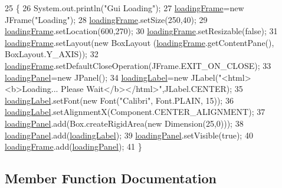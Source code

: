 \begin{DoxyCode}
25     \{
26         System.out.println(\textcolor{stringliteral}{"Gui Loading"});
27         \hyperlink{classGuiLoading_a7790e84aa69edf129d802057d0420608}{loadingFrame}=\textcolor{keyword}{new} JFrame(\textcolor{stringliteral}{"Loading"});
28         \hyperlink{classGuiLoading_a7790e84aa69edf129d802057d0420608}{loadingFrame}.setSize(250,40); 
29         \hyperlink{classGuiLoading_a7790e84aa69edf129d802057d0420608}{loadingFrame}.setLocation(600,270);
30         \hyperlink{classGuiLoading_a7790e84aa69edf129d802057d0420608}{loadingFrame}.setResizable(\textcolor{keyword}{false});
31         \hyperlink{classGuiLoading_a7790e84aa69edf129d802057d0420608}{loadingFrame}.setLayout(\textcolor{keyword}{new} BoxLayout (\hyperlink{classGuiLoading_a7790e84aa69edf129d802057d0420608}{loadingFrame}.getContentPane(), 
      BoxLayout.Y\_AXIS));
32         \hyperlink{classGuiLoading_a7790e84aa69edf129d802057d0420608}{loadingFrame}.setDefaultCloseOperation(JFrame.EXIT\_ON\_CLOSE);
33         \hyperlink{classGuiLoading_ad7da2e974b1f70476fc92e8b3dc7e853}{loadingPanel}=\textcolor{keyword}{new} JPanel();
34         \hyperlink{classGuiLoading_a885e7ee695236c2a7a4428658828b827}{loadingLabel}=\textcolor{keyword}{new} JLabel(\textcolor{stringliteral}{"<html><b>Loading... Please Wait</b></html>"},JLabel.CENTER);
35         \hyperlink{classGuiLoading_a885e7ee695236c2a7a4428658828b827}{loadingLabel}.setFont(\textcolor{keyword}{new} Font(\textcolor{stringliteral}{"Calibri"}, Font.PLAIN, 15));
36         \hyperlink{classGuiLoading_a885e7ee695236c2a7a4428658828b827}{loadingLabel}.setAlignmentX(Component.CENTER\_ALIGNMENT);
37         \hyperlink{classGuiLoading_ad7da2e974b1f70476fc92e8b3dc7e853}{loadingPanel}.add(Box.createRigidArea(\textcolor{keyword}{new} Dimension(25,0)));
38         \hyperlink{classGuiLoading_ad7da2e974b1f70476fc92e8b3dc7e853}{loadingPanel}.add(\hyperlink{classGuiLoading_a885e7ee695236c2a7a4428658828b827}{loadingLabel});
39         \hyperlink{classGuiLoading_ad7da2e974b1f70476fc92e8b3dc7e853}{loadingPanel}.setVisible(\textcolor{keyword}{true});
40         \hyperlink{classGuiLoading_a7790e84aa69edf129d802057d0420608}{loadingFrame}.add(\hyperlink{classGuiLoading_ad7da2e974b1f70476fc92e8b3dc7e853}{loadingPanel});
41     \}
\end{DoxyCode}


\subsection{Member Function Documentation}
